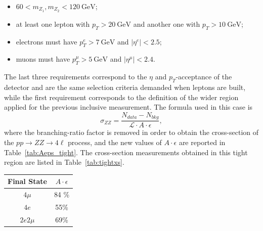 \begin{itemize}
\item $60 < m_{Z_1},m_{Z_2} < 120~\mathrm{GeV}$;
\item at least one lepton with $p_T > 20~\mathrm{GeV}$ and another one with $p_T > 10~\mathrm{GeV}$;
\item electrons must have $p_T^e > 7~\mathrm{GeV}$ and $|\eta^e|<2.5$;
\item muons must have $p_T^{\mu} > 5~\mathrm{GeV}$ and $|\eta^{\mu}|<2.4.$
\end{itemize}
The last three requirements correspond to the $\eta$ and $p_T$-acceptance of the detector and are the same selection criteria demanded when leptons are built, while the first requirement corresponds to the definition of the wider region applied for the previous inclusive measurement. The formula used in this case is
$$\sigma_{ZZ} = \frac{N_{data}-N_{bkg}}{\mathcal{L}\cdot A \cdot \epsilon},$$
where the branching-ratio factor is removed in order to obtain the cross-section of the $pp\to ZZ\to 4\ell$ process, and the new values of $ A \cdot \epsilon$ are reported in Table~\ref{tab:Aeps_tight}. The cross-section measurements obtained in this tight region are listed in Table~\ref{tab:tightxs}.
\begin{table}[htbH]
\begin{center}
\begin{tabular}{cc}
\hline Final State & $A\cdot\epsilon$\\
\hline $4\mu$ & 84 \%  \\
$4e$ & 55\%\\
$2e2\mu$ & 69\%\\
\hline
\end{tabular}
\end{center}
\end{table}
